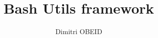 \documentclass[a4paper,10pt]{article}
\title{\color{sec1}Bash Utils framework }\color{text}
\author{Dimitri OBEID}
\begin{document}
    \maketitle
    \newpage

    \hypertarget{contents}{}
    \tableofcontents
    \newpage

    \color{sec1}
    \section{}\color{text}




\end{document}
